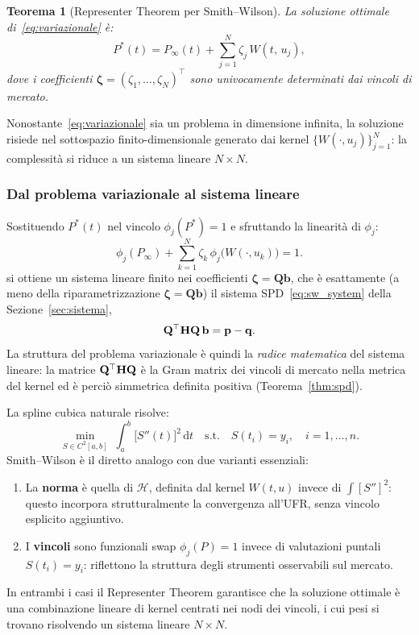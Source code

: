 \documentclass[11pt,a4paper]{article}
\theoremstyle{plain}
\newtheorem{teorema}{Teorema}[section]
\theoremstyle{definition}
\theoremstyle{remark}
\newcommand{\bfzeta}{\bm{\zeta}}
\newcommand{\bfb}{\mathbf{b}}
\newcommand{\bfp}{\mathbf{p}}
\newcommand{\bfq}{\mathbf{q}}
\newcommand{\Hmat}{\mathbf{H}}
\newcommand{\Qmat}{\mathbf{Q}}
\newcommand{\transp}{^{\mskip-1mu\top}}
\begin{document}
\begin{teorema}[Representer Theorem per Smith--Wilson]
\label{thm:representer}
La soluzione ottimale di~\eqref{eq:variazionale} \`e:
\[
  P^*(t) = P_\infty(t) + \sum_{j=1}^{N} \zeta_j\,W(t,\,u_j),
\]
dove i coefficienti $\bfzeta = (\zeta_1,\ldots,\zeta_N)^\top$ sono univocamente
determinati dai vincoli di mercato.
\end{teorema}

Nonostante~\eqref{eq:variazionale} sia un problema in dimensione infinita,
la soluzione risiede nel sottospazio finito-dimensionale generato dai kernel
$\{W(\cdot,u_j)\}_{j=1}^N$: la complessit\`a si riduce a un sistema lineare $N\times N$.

\subsubsection*{Dal problema variazionale al sistema lineare}

Sostituendo $P^*(t)$ nel vincolo $\phi_j(P^*) = 1$ e sfruttando la
linearit\`a di $\phi_j$:
\[
  \phi_j(P_\infty) + \sum_{k=1}^{N} \zeta_k\,\phi_j\!\bigl(W(\cdot,u_k)\bigr) = 1.
\]
si ottiene un sistema lineare finito nei coefficienti $\bfzeta=\Qmat\bfb$, che è
esattamente (a meno della riparametrizzazione $\bfzeta=\Qmat\bfb$) il sistema
SPD~\eqref{eq:sw_system} della Sezione~\ref{sec:sistema},
\[
  \Qmat\transp\Hmat\Qmat\,\bfb = \bfp - \bfq.
\]
La struttura del problema variazionale \`e quindi la \emph{radice matematica}
del sistema lineare: la matrice $\Qmat\transp\Hmat\Qmat$ è la Gram matrix dei
vincoli di mercato nella metrica del kernel ed è perciò simmetrica definita
positiva (Teorema~\ref{thm:spd}).

\begin{keybox}
La spline cubica naturale risolve:
\[
  \min_{S \in C^2[a,b]}\;\int_a^b \bigl[S''(t)\bigr]^2\,\mathrm{d}t
  \quad\text{s.t.}\quad S(t_i) = y_i,\quad i=1,\ldots,n.
\]
Smith--Wilson \`e il diretto analogo con due varianti essenziali:
\begin{enumerate}
  \item La \textbf{norma} \`e quella di $\mathcal{H}$, definita dal kernel
        $W(t,u)$ invece di $\int[S'']^2$: questo incorpora strutturalmente
        la convergenza all'UFR, senza vincolo esplicito aggiuntivo.
  \item I \textbf{vincoli} sono funzionali swap $\phi_j(P)=1$ invece di
        valutazioni puntali $S(t_i)=y_i$: riflettono la struttura degli
        strumenti osservabili sul mercato.
\end{enumerate}
In entrambi i casi il Representer Theorem garantisce che la soluzione ottimale
\`e una combinazione lineare di kernel centrati nei nodi dei vincoli,
i cui pesi si trovano risolvendo un sistema lineare $N\times N$.
\end{keybox}
\end{document}
